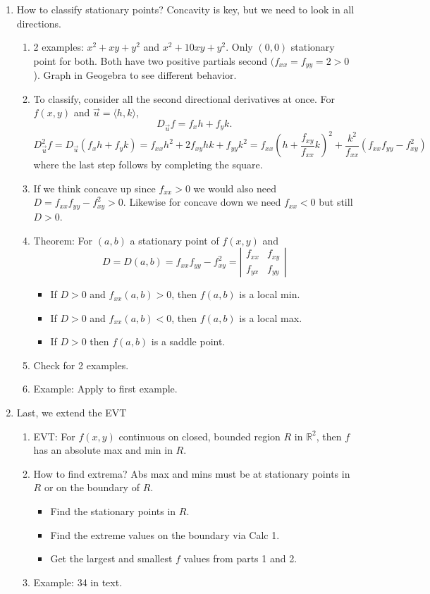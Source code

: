 \documentclass{article}
\begin{document}
\begin{enumerate}
\item How to classify stationary points? Concavity is key, but we need to look in all directions.
\begin{enumerate}
\item 2 examples: $x^2+xy+y^2$ and $x^2+10xy+y^2$. Only $(0,0)$ stationary point for both. Both have two positive partials second $(f_{xx}=f_{yy}=2>0$). Graph in Geogebra to see different behavior.
\item To classify, consider all the second directional derivatives at once. For $f(x,y)$ and $\vec{u} = \langle h,k \rangle$,
\[
D_{\vec{u}} f = f_x h + f_yk.
\]
\[
D_{\vec{u}}^2 f = D_{\vec{u}}\left( f_x h + f_yk \right) = f_{xx} h^2 + 2f_{xy}hk + f_{yy}k^2 = f_{xx} \left(h + \frac{f_{xy}}{f_{xx}} k\right)^2 + \frac{k^2}{f_{xx}} \left(f_{xx}f_{yy}-f_{xy}^2 \right)
\]
where the last step follows by completing the square.
\item If we think concave up since $f_{xx}>0$ we would also need $D=f_{xx}f_{yy}-f_{xy}^2>0$. Likewise for concave down we need $f_{xx}<0$ but still $D>0$.
\item Theorem: For $(a,b)$ a stationary point of $f(x,y)$ and 
\[
D = D(a,b) = f_{xx}f_{yy}-f_{xy}^2 = \left|
\begin{array}{cc}
f_{xx} & f_{xy} \\
f_{yx} & f_{yy} 
\end{array}
\right|
\]
\begin{itemize}
\item If $D>0$ and $f_{xx}(a,b)>0$, then $f(a,b)$ is a local min.
\item If $D>0$ and $f_{xx}(a,b)<0$, then $f(a,b)$ is a local max.
\item If $D>0$ then $f(a,b)$ is a saddle point.
\end{itemize}
\item Check for 2 examples.
\item Example: Apply to first example.
\end{enumerate}

\item Last, we extend the EVT
\begin{enumerate}
\item EVT: For $f(x,y)$ continuous on closed, bounded region $R$ in $\mathbb{R}^2$, then $f$ has an absolute max and min in $R$.
\item How to find extrema? Abs max and mins must be at stationary points in $R$ or on the boundary of $R$.
\begin{itemize}
\item Find the stationary points in $R$.
\item Find the extreme values on the boundary via Calc 1.
\item Get the largest and smallest $f$ values from parts 1 and 2.
\end{itemize}
\item Example: 34 in text.
\end{enumerate}


\end{enumerate}
\end{document}
